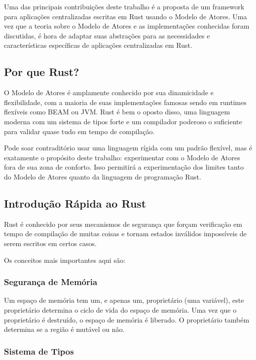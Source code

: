 Uma das principais contribuições deste trabalho é a proposta de um framework para aplicações centralizadas escritas em Rust usando o Modelo de Atores. Uma vez que a teoria sobre o Modelo de Atores e as implementações conhecidas foram discutidas, é hora de adaptar suas abstrações para as necessidades e características específicas de aplicações centralizadas em Rust.

\subsection{Por que Rust?}

O Modelo de Atores é amplamente conhecido por sua dinamicidade e flexibilidade, com a maioria de suas implementações famosas sendo em runtimes flexíveis como BEAM ou JVM. Rust é bem o oposto disso, uma linguagem moderna com um sistema de tipos forte e um compilador poderoso o suficiente para validar quase tudo em tempo de compilação.

Pode soar contraditório usar uma linguagem rígida com um padrão flexível, mas é exatamente o propósito deste trabalho: experimentar com o Modelo de Atores fora de sua zona de conforto. Isso permitirá a experimentação dos limites tanto do Modelo de Atores quanto da linguagem de programação Rust.

\subsection{Introdução Rápida ao Rust}

Rust é conhecido por seus mecanismos de segurança que forçam verificação em tempo de compilação de muitas coisas e tornam estados inválidos impossíveis de serem escritos em certos casos.

Os conceitos mais importantes aqui são:

\subsubsection{Segurança de Memória}

Um espaço de memória tem um, e apenas um, proprietário (uma variável), este proprietário determina o ciclo de vida do espaço de memória. Uma vez que o proprietário é destruído, o espaço de memória é liberado. O proprietário também determina se a região é mutável ou não.

\subsubsection{Sistema de Tipos}

